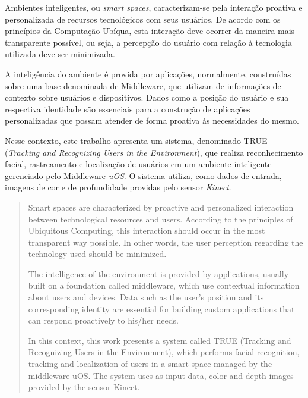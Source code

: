 \begin{resumo}

Ambientes inteligentes, ou \textit{smart spaces}, caracterizam-se pela interação proativa e personalizada de recursos tecnológicos com seus usuários. De acordo com os princípios da Computação Ubíqua, esta interação deve ocorrer da maneira mais transparente possível, ou seja, a percepção do usuário com relação à tecnologia utilizada deve ser minimizada.

A inteligência do ambiente é provida por aplicações, normalmente, construídas sobre uma base denominada de Middleware, que utilizam de informações de contexto sobre usuários e dispositivos. Dados como a posição do usuário e sua respectiva identidade são essenciais para a construção de aplicações personalizadas que possam atender de forma proativa às necessidades do mesmo.

Nesse contexto, este trabalho apresenta um sistema, denominado TRUE (\textit{Tracking and Recognizing Users in the Environment}), que realiza reconhecimento facial, rastreamento e localização de usuários em um ambiente inteligente gerenciado pelo Middleware \textit{uOS}. O sistema utiliza, como dados de entrada, imagens de cor e de profundidade providas pelo sensor \textit{Kinect}.

\end{resumo}


\begin{abstract}
	
Smart spaces are characterized by proactive and personalized interaction between technological resources and users. According to the principles of Ubiquitous Computing, this interaction should occur in the most transparent way possible. In other words, the user perception regarding the technology used should be minimized.

The intelligence of the environment is provided by applications, usually built on a foundation called middleware, which use contextual information about users and devices. Data such as the user's position and its corresponding identity are essential for building custom applications that can respond proactively to his/her needs.

In this context, this work presents a system called TRUE (Tracking and Recognizing Users in the Environment), which performs facial recognition, tracking and localization of users in a smart space managed by the middleware uOS. The system uses as input data, color  and depth images provided by the sensor Kinect.


\end{abstract}

